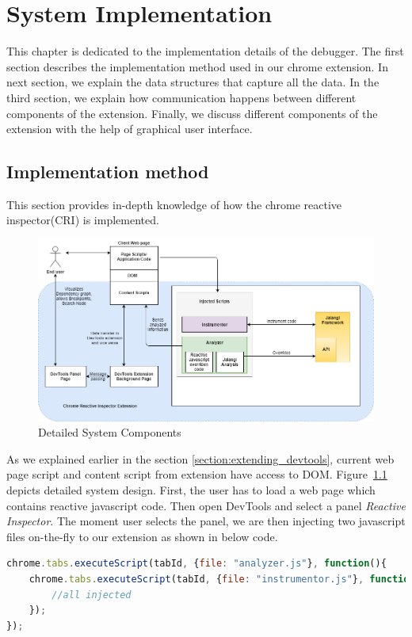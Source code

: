 \chapter{System Implementation} \label{chap:Implementation}
This chapter is dedicated to the implementation details of the debugger. The first section describes the implementation method used in our chrome extension. In next section, we explain the data structures that capture all the data. In the third section, we explain how communication happens between different components of the extension. Finally, we discuss different components of the extension with the help of graphical user interface.

\section{Implementation method}
This section provides in-depth knowledge of how the chrome reactive inspector(CRI) is implemented.

 
\begin{figure}[!h]
	\centering
	\includegraphics[width=\textwidth,height=\textheight,keepaspectratio]{images/detailed-system-implementation.png}
	\caption{Detailed System Components}
	\label{fig:detailed-system-implementation}
\end{figure}
As we explained earlier in the section \ref{section:extending_devtools}, current web page script and content script from extension have access to DOM. Figure~\ref{fig:detailed-system-implementation} depicts detailed system design. First, the user has to load a web page which contains reactive javascript code. Then open DevTools and select a panel \textit{Reactive Inspector}. The moment user selects the panel, we are then injecting two javascript files on-the-fly to our extension as shown in below code.


\begin{lstlisting}[language=JavaScript, caption=Injecting Javascript Files, label={lst:inject-javascript-files}]
chrome.tabs.executeScript(tabId, {file: "analyzer.js"}, function(){
	chrome.tabs.executeScript(tabId, {file: "instrumentor.js"}, function(){
		//all injected
	});
});
\end{lstlisting}

